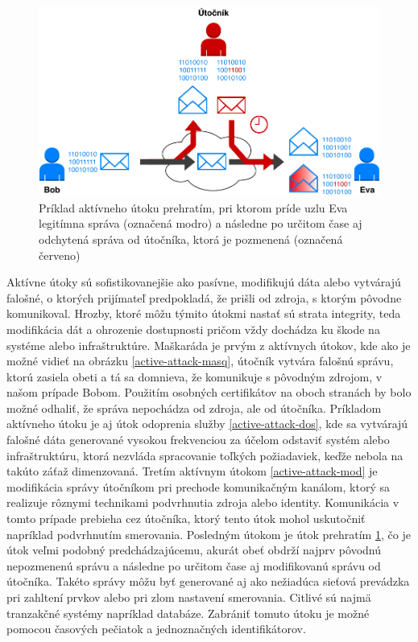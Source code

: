 \begin{figure}[H]
	\begin{center}
		\includegraphics[scale=0.55]{obrazky/active-attack-reply.pdf}
	\end{center}
	\caption[Aktívny útok prehratím]{Príklad aktívneho útoku prehratím, pri ktorom príde uzlu Eva legitímna správa (označená modro) a následne po určitom čase aj odchytená správa od útočníka, ktorá je pozmenená (označená červeno) \cite{Stallings2011}}
	\label{active-attack-reply}
\end{figure}

Aktívne útoky sú sofistikovanejšie ako pasívne, modifikujú dáta alebo vytvárajú falošné, o ktorých prijímateľ predpokladá, že prišli od zdroja, s ktorým pôvodne komunikoval. Hrozby, ktoré môžu týmito útokmi nastať sú strata integrity, teda modifikácia dát a ohrozenie dostupnosti pričom vždy dochádza ku škode na systéme alebo infraštruktúre. Maškaráda je prvým z aktívnych útokov, kde ako je možné vidieť na obrázku \ref{active-attack-masq}, útočník vytvára falošnú správu, ktorú zasiela obeti a tá sa domnieva, že komunikuje s pôvodným zdrojom, v našom prípade Bobom. Použitím osobných certifikátov na oboch stranách by bolo možné odhaliť, že správa nepochádza od zdroja, ale od útočníka. Príkladom aktívneho útoku je aj útok odoprenia služby \ref{active-attack-dos}, kde sa vytvárajú falošné dáta generované vysokou frekvenciou za účelom odstaviť systém alebo infraštruktúru, ktorá nezvláda spracovanie toľkých požiadaviek, keďže nebola na takúto záťaž dimenzovaná. Tretím aktívnym útokom \ref{active-attack-mod} je modifikácia správy útočníkom pri prechode komunikačným kanálom, ktorý sa realizuje rôznymi technikami podvrhnutia zdroja alebo identity. Komunikácia v tomto prípade prebieha cez útočníka, ktorý tento útok mohol uskutočniť napríklad podvrhnutím smerovania. Posledným útokom je útok prehratím \ref{active-attack-reply}, čo je útok veľmi podobný predchádzajúcemu, akurát obeť obdrží najprv pôvodnú nepozmenenú správu a následne po určitom čase aj modifikovanú správu od útočníka. Takéto správy môžu byť generované aj ako nežiadúca sieťová prevádzka pri zahltení prvkov alebo pri zlom nastavení smerovania. Citlivé sú najmä tranzakčné systémy napríklad databáze. Zabrániť tomuto útoku je možné pomocou časových pečiatok a jednoznačných identifikátorov. 




